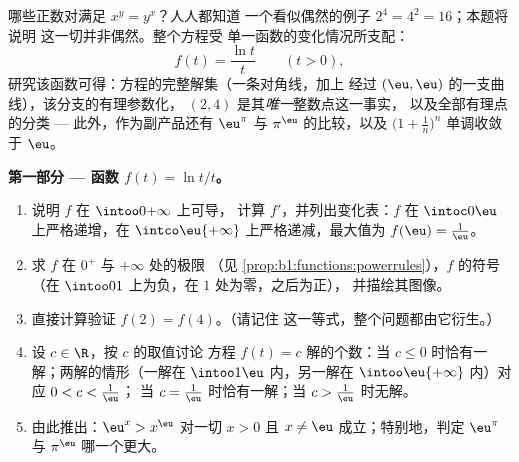 \begin{problem}\label{pb:b1:functions:1}
哪些正数对满足 $x^y = y^x$？人人都知道
一个看似偶然的例子 $2^4 = 4^2 = 16$；本题将说明
这一切并非偶然。整个方程受
单一函数的变化情况所支配：
\[
f(t) = \frac{\ln t}{t} \qquad (t > 0),
\]
研究该函数可得：方程的完整解集（一条对角线，加上
经过 $(\eu, \eu)$ 的一支曲线），该分支的有理参数化，
$(2, 4)$ 是其\emph{唯一}整数点这一事实，
以及全部有理点的分类 --- 此外，作为副产品还有
$\eu^\pi$ 与 $\pi^\eu$ 的比较，以及
$\bigl(1 + \frac1n\bigr)^n$ 单调收敛于 $\eu$。

\medskip
\noindent\textbf{第一部分 --- 函数 $f(t) = \ln t / t$。}
\begin{enumerate}
  \item 说明 $f$ 在 $\intoo0{+\infty}$ 上可导，
        计算 $f'$，并列出变化表：$f$
        在 $\intoc0\eu$ 上严格递增，在
        $\intco\eu{+\infty}$ 上严格递减，最大值为 $f(\eu) = \frac1\eu$。
  \item 求 $f$ 在 $0^+$ 与 $+\infty$ 处的极限
        （见 \cref{prop:b1:functions:powerrules}），$f$ 的符号
        （在 $\intoo01$ 上为负，在 $1$ 处为零，之后为正），
        并描绘其图像。
  \item 直接计算验证 $f(2) = f(4)$。（请记住
        这一等式，整个问题都由它衍生。）
  \item 设 $c \in \R$，按 $c$ 的取值讨论
        方程 $f(t) = c$ 解的个数：当 $c \leq
        0$ 时恰有一解；两解的情形（一解在 $\intoo1\eu$ 内，另一解在
        $\intoo\eu{+\infty}$ 内）对应 $0 < c < \frac1\eu$；
        当 $c = \frac1\eu$ 时恰有一解；当 $c > \frac1\eu$ 时无解。
  \item 由此推出：$\eu^x > x^\eu$ 对一切 $x > 0$ 且 $x \neq
        \eu$ 成立；特别地，判定 $\eu^\pi$ 与
        $\pi^\eu$ 哪一个更大。
\end{enumerate}


\end{problem}
